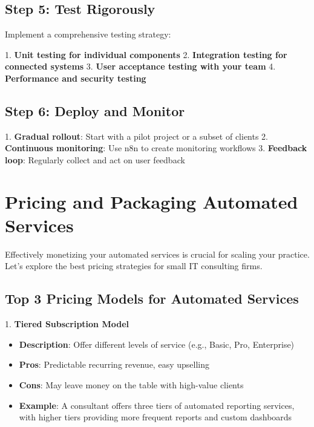 
\subsection{Step 5: Test Rigorously}

Implement a comprehensive testing strategy:

1. \textbf{Unit testing for individual components}
2. \textbf{Integration testing for connected systems}
3. \textbf{User acceptance testing with your team}
4. \textbf{Performance and security testing}


\subsection{Step 6: Deploy and Monitor}

1. \textbf{Gradual rollout}: Start with a pilot project or a subset of clients
2. \textbf{Continuous monitoring}: Use n8n to create monitoring workflows
3. \textbf{Feedback loop}: Regularly collect and act on user feedback



\section{Pricing and Packaging Automated Services}

Effectively monetizing your automated services is crucial for scaling your practice. Let's explore the best pricing strategies for small IT consulting firms.

\subsection{Top 3 Pricing Models for Automated Services}

1. \textbf{Tiered Subscription Model}
\begin{itemize}
    \item \textbf{Description}: Offer different levels of service (e.g., Basic, Pro, Enterprise)
    \item \textbf{Pros}: Predictable recurring revenue, easy upselling
    \item \textbf{Cons}: May leave money on the table with high-value clients
    \item \textbf{Example}: A consultant offers three tiers of automated reporting services, with higher tiers providing more frequent reports and custom dashboards
\end{itemize}

